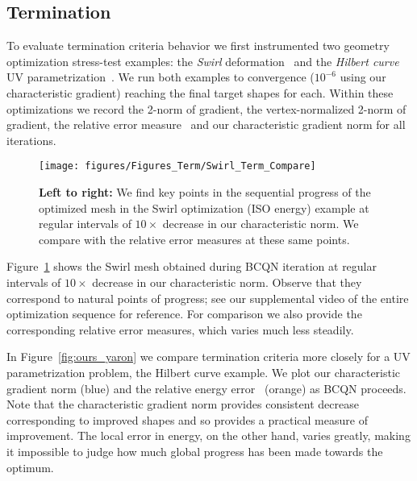 \subsection{Termination} 
\label{sec:term_results}

To evaluate termination criteria behavior we first instrumented two
geometry optimization stress-test examples: the \emph{Swirl}
deformation~\cite{Chen:2013:PSI} and the \emph{Hilbert curve} UV
parametrization~\cite{Smith:2015:BPW}. We run both examples to
convergence ($10^{-6}$ using our characteristic gradient) reaching
the final target shapes for each. Within these optimizations we
record the 2-norm of gradient, the vertex-normalized 2-norm of
gradient, the
relative error measure~\cite{Kovalsky:2016:AQP,Shtengel:2017:GOV}
and our characteristic gradient norm for all iterations.

\begin{figure}[t]
\vspace{3mm}
\centering
\texttt{[image: figures/Figures\_Term/Swirl\_Term\_Compare]}
\caption{ {\bf Left to right:}
We find key points in the sequential progress of the optimized mesh
in the Swirl optimization (ISO energy) example at regular intervals of $10\times$ decrease
in our characteristic norm. We compare with the relative error measures at these same points.}
\label{fig:swirl_term_compare}
\vspace{3mm}
\end{figure}

Figure~\ref{fig:swirl_term_compare} shows the Swirl mesh
obtained during BCQN iteration at regular intervals of $10\times$
decrease in our characteristic norm. Observe
that they correspond to natural points of progress;
see our supplemental video of the entire optimization sequence
for reference. For comparison we also provide the corresponding relative
error measures, which varies much less steadily.

In Figure~\ref{fig:ours_yaron} we compare
termination criteria more closely for a UV parametrization
problem, the Hilbert curve example. We plot our characteristic gradient norm
(blue) and the relative energy error~\cite{Kovalsky:2016:AQP,Shtengel:2017:GOV}
(orange) as BCQN proceeds. Note
that the characteristic gradient norm provides consistent decrease
corresponding to improved shapes and so provides a
practical measure of improvement. The local error in energy, on the
other hand, varies greatly, making it impossible to judge how much
global progress has been made towards the optimum.

